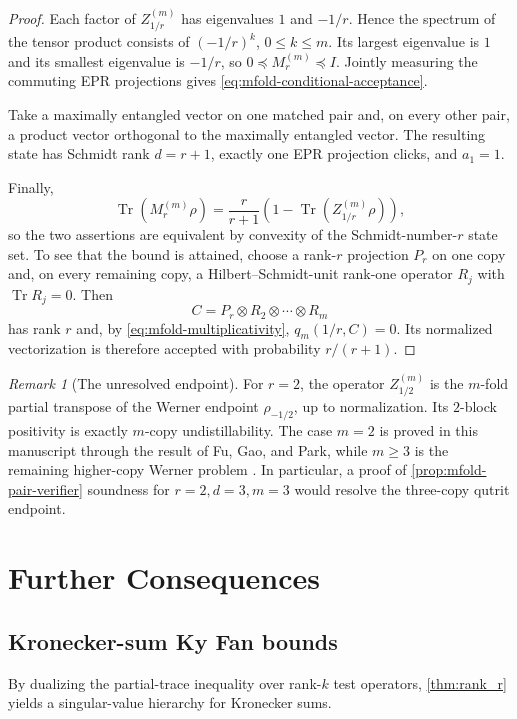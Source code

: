 \documentclass[11pt,reqno]{amsart}
\theoremstyle{remark}
\newtheorem{remark}[theorem]{Remark}
\DeclareMathOperator{\Tr}{Tr}
\begin{document}
\begin{proof}
Each factor of $Z_{1/r}^{(m)}$ has eigenvalues $1$ and $-1/r$.
Hence the spectrum of the tensor product consists of
$(-1/r)^k$, $0\le k\le m$.  Its largest eigenvalue is $1$ and its
smallest eigenvalue is $-1/r$, so
$0\preceq M_r^{(m)}\preceq I$.  Jointly measuring the commuting EPR
projections gives \cref{eq:mfold-conditional-acceptance}.

Take a maximally entangled vector on one matched pair and, on every
other pair, a product vector orthogonal to the maximally entangled
vector.  The resulting state has Schmidt rank $d=r+1$, exactly one
EPR projection clicks, and $a_1=1$.

Finally,
\[
    \Tr(M_r^{(m)}\rho)
    =\frac{r}{r+1}
      \left(1-\Tr(Z_{1/r}^{(m)}\rho)\right),
\]
so the two assertions are equivalent by convexity of the
Schmidt-number-$r$ state set.  To see that the bound is attained,
choose a rank-$r$ projection $P_r$ on one copy and, on every remaining
copy, a Hilbert--Schmidt-unit rank-one operator $R_j$ with
$\Tr R_j=0$.  Then
\[
    C=P_r\otimes R_2\otimes\cdots\otimes R_m
\]
has rank $r$ and, by \cref{eq:mfold-multiplicativity},
$q_m(1/r,C)=0$.  Its normalized vectorization is therefore accepted
with probability $r/(r+1)$.
\end{proof}

\begin{remark}[The unresolved endpoint]
For $r=2$, the operator $Z_{1/2}^{(m)}$ is the $m$-fold partial
transpose of the Werner endpoint $\rho_{-1/2}$, up to normalization.
Its $2$-block positivity is exactly $m$-copy undistillability.  The
case $m=2$ is proved in this manuscript through the result of Fu, Gao,
and Park, while $m\ge3$ is the remaining higher-copy Werner problem
\cite{fu2026solution2copydistillabilitywerner}.  In particular, a
proof of \cref{prop:mfold-pair-verifier} soundness for
$r=2,d=3,m=3$ would resolve the three-copy qutrit endpoint.
\end{remark}

\section{Further Consequences}

\subsection{Kronecker-sum Ky Fan bounds}

By dualizing the partial-trace inequality over rank-$k$ test
operators, \cref{thm:rank_r} yields a singular-value hierarchy for
Kronecker sums.
\end{document}
